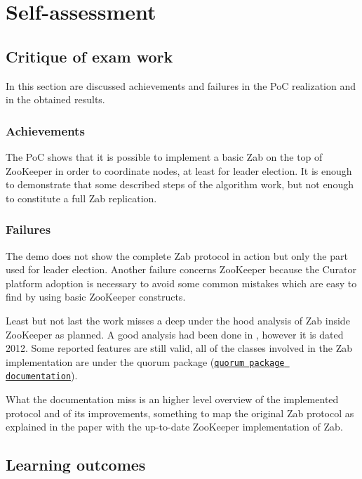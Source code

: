 \chapter{Self-assessment\label{sec:assessment}}

\section{Critique of exam work\label{sec:critique}}
In this section are discussed achievements and failures in the PoC realization and in the obtained results.

\subsection{Achievements\label{sec:achievements}}
The PoC shows that it is possible to implement a basic Zab on the top of ZooKeeper in order to coordinate nodes, at least for leader election.
It is enough to demonstrate that some described steps of the algorithm work, but not enough to constitute a full Zab replication.

\subsection{Failures\label{sec:failures}}
The demo does not show the complete Zab protocol in action but only the part used for leader election.
Another failure concerns ZooKeeper because the Curator platform adoption is necessary to avoid some common mistakes which are easy to find by using basic ZooKeeper constructs.

Least but not last the work misses a deep under the hood analysis of Zab inside ZooKeeper as planned.
A good analysis had been done in \cite{medeiros2012zookeeper}, however it is dated 2012.
Some reported features are still valid, all of the classes involved in the Zab implementation are under the quorum package (\href{https://zookeeper.apache.org/doc/r3.6.2/apidocs/zookeeper-server/org/apache/zookeeper/server/quorum/package-frame.html}{\texttt{quorum package documentation}}).

What the documentation miss is an higher level overview of the implemented protocol and of its improvements, something to map the original Zab protocol as explained in the paper with the up-to-date ZooKeeper implementation of Zab.

\clearpage

\section{Learning outcomes\label{sec:outcomes}}

